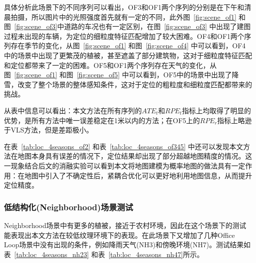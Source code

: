 具体分析此场景下的不同序列可以看出，OF3和OF1两个序列的分别是在下午和清晨拍摄，所以图片中的光照强度首先就有一定的不同，此外图~\ref{fig:scene_of1} 和图~\ref{fig:scene_of3}中道路的车况也有一定区别，在图~\ref{fig:scene_of3} 中出现了建图过程未出现的车辆，为定位的细粒度特征匹配增加了较大困难。OF4和OF1两个序列存在季节的变化，从图~\ref{fig:scene_of1} 和图~\ref{fig:scene_of4} 中可以看到，OF4中的场景中出现了更繁茂的植被，甚至遮盖了部分建筑物，这对于细粒度特征匹配和定位都带来了一定的困难。OF5和OF1两个序列存在天气的变化，从图~\ref{fig:scene_of1} 和图~\ref{fig:scene_of5} 中可以看到，OF5中的场景中出现了降雪，改变了整个场景的整体感知条件，这对于定位的粗粒度和细粒度匹配都带来的挑战。

从表中信息可以看出：本文方法在所有序列的$ATE_t$和$RPE_t$指标上均取得了明显的优势，是所有方法中唯一误差稳定在1米以内的方法；在OF5上的$RPE_r$指标上略逊于VLS方法，但是差距极小。

在表~\ref{tab:loc_4seasons_of2} 和表~\ref{tab:loc_4seasons_of345} 中还可以发现本文方法在地图本身具有误差的情况下，定位结果却出现了部分超越地图精度的情况。这一现象结合后文的消融实验可以看到本文将地图建模为概率地图的做法具有一定作用：在地图中引入了不确定性后，紧耦合优化可以更好地利用地图信息，从而提升定位精度。


\subsubsection{低结构化(Neighborhood)场景测试}


Neighborhood场景中有更多的植被，接近于农村环境，因此在这个场景下的测试能表现出本文方法在较低纹理环境下的表现。在此场景下又增加了几种Office Loop场景中没有出现的条件，例如降雨天气(NH3)和傍晚环境(NH7)。测试结果如表~\ref{tab:loc_4seasons_nh23} 和表~\ref{tab:loc_4seasons_nh47}所示。

